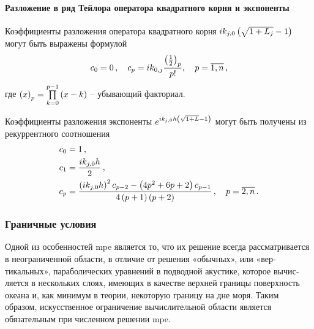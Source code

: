 \documentclass[../document.tex]{subfiles}
\begin{document}
                \paragraph{Разложение в ряд Тейлора оператора квадратного корня и экспоненты}
                    \par Коэффициенты разложения оператора квадратного корня $ik_{j,0}\left(\sqrt{1+L_j}-1\right)$ могут быть выражены формулой
                    \begin{equation}
                        c_0=0\,,\quad c_p=ik_{0,j}\frac{\left(\frac{1}{2}\right)_p}{p!},\quad p=\overline{1,n}\,,
                    \end{equation}
                    где $\left(x\right)_p=\prod\limits_{k=0}^{p-1}\left(x-k\right)$ -- убывающий факториал.
                    \par Коэффициенты разложения экспоненты $e^{ik_{j,0}h\left(\sqrt{1+L}-1\right)}$ могут быть получены из рекуррентного соотношения
                    \begin{equation}
                        \begin{aligned}
                            c_0&=1\,,\\
                            c_1&=\frac{ik_{j,0}h}{2}\,,\\
                            c_p&=\frac{\left(ik_{j,0}h\right)^2c_{p-2}-\left(4p^2+6p+2\right)c_{p-1}}{4\left(p+1\right)\left(p+2\right)}\,,\quad p=\overline{2,n}\,.
                        \end{aligned}
                    \end{equation}
            \subsubsection{Граничные условия}
                \par Одной из особенностей \acrshort{mpe} является то, что их решение всегда рассмат­ривается в неограниченной области, в отличие от решения «обычных», или «вер­тикальных», параболических уравнений в подводной акустике, которое вычис­ляется в нескольких слоях, имеющих в качестве верхней границы поверхность океана и, как минимум в теории, некоторую границу на дне моря. Таким образом, искусственное ограничение вычислительной области является обязательным при численном решении \acrshort{mpe}.
\end{document}
